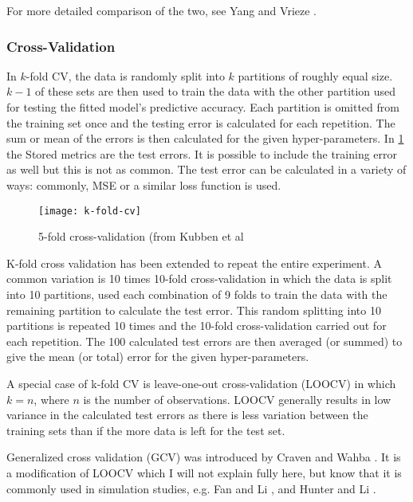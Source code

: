 For more detailed comparison of the two, see Yang  and Vrieze .

\subsubsection{Cross-Validation}

In $k$-fold CV, the data is randomly split into $k$ partitions of roughly equal size. $k-1$ of these sets are then used to train the data with the other partition used for testing the fitted model's predictive accuracy. Each partition is omitted from the training set once and the testing error is calculated for each repetition. The sum or mean of the errors is then calculated for the given hyper-parameters. In \cref{fig:k-fold-cv} the Stored metrics are the test errors. It is possible to include the training error as well but this is not as common. The test error can be calculated in a variety of ways: commonly, MSE or a similar loss function is used.

\begin{figure}[ht!]
  \texttt{[image: k-fold-cv]}
  \caption{5-fold cross-validation (from Kubben et al }
  \label{fig:k-fold-cv}
\end{figure}

K-fold cross validation has been extended to repeat the entire experiment. A common variation is 10 times 10-fold cross-validation in which the data is split into 10 partitions, used each combination of 9 folds to train the data with the remaining partition to calculate the test error. This random splitting into 10 partitions is repeated 10 times and the 10-fold cross-validation carried out for each repetition. The 100 calculated test errors are then averaged (or summed) to give the mean (or total) error for the given hyper-parameters.

A special case of k-fold CV is leave-one-out cross-validation (LOOCV) in which $k=n$, where $n$ is the number of observations. LOOCV generally results in low variance in the calculated test errors as there is less variation between the training sets than if the more data is left for the test set.

Generalized cross validation (GCV) was introduced by Craven and Wahba . It is a modification of LOOCV which I will not explain fully here, but know that it is commonly used in simulation studies, e.g. Fan and Li , and Hunter and Li .

